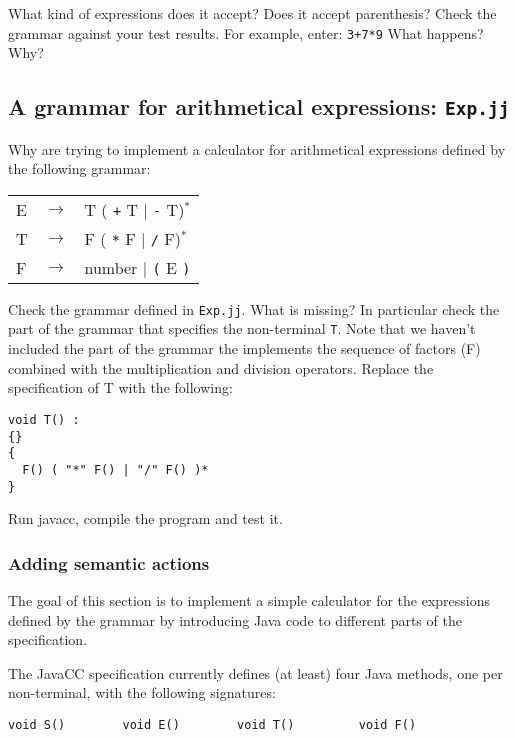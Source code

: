 \documentclass{article}
\begin{document}
What kind of expressions does it accept? Does it accept parenthesis? Check the grammar against your test results.
For example, enter: {\tt 3+7*9}
What happens? Why?

\subsection*{A grammar for arithmetical expressions: {\tt Exp.jj}}

Why are trying to implement a calculator for arithmetical expressions defined by the following grammar:\\

\begin{tabular}{lcl}
E & $\rightarrow$ & T ( \verb-+- T $|$ \verb+-+ T)$^*$ \\
T & $\rightarrow$ & F ( \verb+*+ F $|$ \verb+/+ F)$^*$ \\
F & $\rightarrow$ & number $|$ \verb+(+ E \verb+)+\\
\end{tabular}

Check the grammar defined in {\tt Exp.jj}. What is missing? In particular check the part of the grammar that specifies the non-terminal {\tt T}. Note that we haven't included the part of the grammar the implements the sequence of factors (F) combined with the multiplication and division operators. Replace the specification of T with the following:

\begin{verbatim}
void T() :
{}
{
  F() ( "*" F() | "/" F() )*
}
\end{verbatim}

Run javacc, compile the program and test it.


\subsubsection*{Adding semantic actions}

The goal of this section is to implement a simple calculator for the expressions defined by the grammar by introducing Java code to different parts of the specification.

The JavaCC specification currently defines (at least) four Java methods, one per non-terminal, with the following signatures:

\begin{verbatim}
void S()        void E()        void T()         void F()
\end{verbatim}
\end{document}
